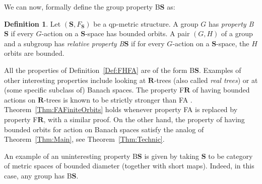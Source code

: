 \documentclass[a4paper]{article}
\theoremstyle{definition}
\newtheorem{defn}[lem]{Definition}
\newcommand*{\BS}{B$\mathbf{S}$}
\begin{document}
We can now, formally define the group property \BS{} as:
%
\begin{defn}\label{Def:PropBS}
Let $(\mathbf S,F_{\mathbf S})$ be a qp-metric structure.
A group $G$ has \emph{property \BS} if every $G$-action on a $\mathbf S$-space has bounded orbits.
A pair $(G,H)$ of a group and a subgroup has \emph{relative property \BS} if for every $G$-action on a $\mathbf S$-space, the $H$ orbits are bounded.
\end{defn}
%
%
All the properties of Definition~\ref{Def:FHFA} are of the form \BS.
Examples of other interesting properties include looking at $\mathbf{R}$-trees (also called \emph{real trees}) or at (some specific subclass of) Banach spaces.
The property F$\mathbf{R}$ of having bounded actions on $\mathbf{R}$-trees is known to be strictly stronger than FA \cite{MR3465847}. Theorem~\ref{Thm:FAFiniteOrbits} holds whenever property FA is replaced by property F$\mathbf{R}$, with a similar proof.
On the other hand, the property of having bounded orbits for action on Banach spaces satisfy the analog of Theorem~\ref{Thm:Main}, see Theorem~\ref{Thm:Technic}.

An example of an uninteresting property \BS{} is given by taking $\mathbf{S}$ to be category of metric spaces of bounded diameter (together with short maps). Indeed, in this case, any group has \BS.
\end{document}
